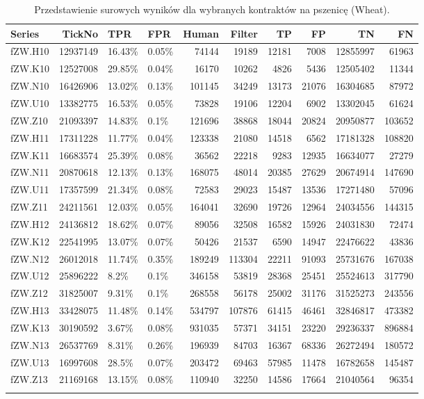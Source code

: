 \documentclass[a4paper,12pt,openany, DIV=calc, headsepline]{scrbook}
\begin{document}
{\scriptsize
\begin{longtable}{lrllrrrrrr}
  \hline
Series & TickNo & TPR & FPR & Human & Filter & TP & FP & TN & FN \\ 
  \hline
fZW.H10 & 12937149 & 16.43\% & 0.05\% & 74144 & 19189 & 12181 & 7008 & 12855997 & 61963 \\ 
  fZW.K10 & 12527008 & 29.85\% & 0.04\% & 16170 & 10262 & 4826 & 5436 & 12505402 & 11344 \\ 
  fZW.N10 & 16426906 & 13.02\% & 0.13\% & 101145 & 34249 & 13173 & 21076 & 16304685 & 87972 \\ 
  fZW.U10 & 13382775 & 16.53\% & 0.05\% & 73828 & 19106 & 12204 & 6902 & 13302045 & 61624 \\ 
  fZW.Z10 & 21093397 & 14.83\% & 0.1\% & 121696 & 38868 & 18044 & 20824 & 20950877 & 103652 \\ 
  fZW.H11 & 17311228 & 11.77\% & 0.04\% & 123338 & 21080 & 14518 & 6562 & 17181328 & 108820 \\ 
  fZW.K11 & 16683574 & 25.39\% & 0.08\% & 36562 & 22218 & 9283 & 12935 & 16634077 & 27279 \\ 
  fZW.N11 & 20870618 & 12.13\% & 0.13\% & 168075 & 48014 & 20385 & 27629 & 20674914 & 147690 \\ 
  fZW.U11 & 17357599 & 21.34\% & 0.08\% & 72583 & 29023 & 15487 & 13536 & 17271480 & 57096 \\ 
  fZW.Z11 & 24211561 & 12.03\% & 0.05\% & 164041 & 32690 & 19726 & 12964 & 24034556 & 144315 \\ 
  fZW.H12 & 24136812 & 18.62\% & 0.07\% & 89056 & 32508 & 16582 & 15926 & 24031830 & 72474 \\ 
  fZW.K12 & 22541995 & 13.07\% & 0.07\% & 50426 & 21537 & 6590 & 14947 & 22476622 & 43836 \\ 
  fZW.N12 & 26012018 & 11.74\% & 0.35\% & 189249 & 113304 & 22211 & 91093 & 25731676 & 167038 \\ 
  fZW.U12 & 25896222 & 8.2\% & 0.1\% & 346158 & 53819 & 28368 & 25451 & 25524613 & 317790 \\ 
  fZW.Z12 & 31825007 & 9.31\% & 0.1\% & 268558 & 56178 & 25002 & 31176 & 31525273 & 243556 \\ 
  fZW.H13 & 33428075 & 11.48\% & 0.14\% & 534797 & 107876 & 61415 & 46461 & 32846817 & 473382 \\ 
  fZW.K13 & 30190592 & 3.67\% & 0.08\% & 931035 & 57371 & 34151 & 23220 & 29236337 & 896884 \\ 
  fZW.N13 & 26537769 & 8.31\% & 0.26\% & 196939 & 84703 & 16367 & 68336 & 26272494 & 180572 \\ 
  fZW.U13 & 16997608 & 28.5\% & 0.07\% & 203472 & 69463 & 57985 & 11478 & 16782658 & 145487 \\ 
  fZW.Z13 & 21169168 & 13.15\% & 0.08\% & 110940 & 32250 & 14586 & 17664 & 21040564 & 96354 \\ 
   \hline
\hline
\caption{Przedstawienie surowych wyników dla wybranych kontraktów na pszenicę (Wheat).}
\label{tab:result3}
\end{longtable}}
\end{document}
